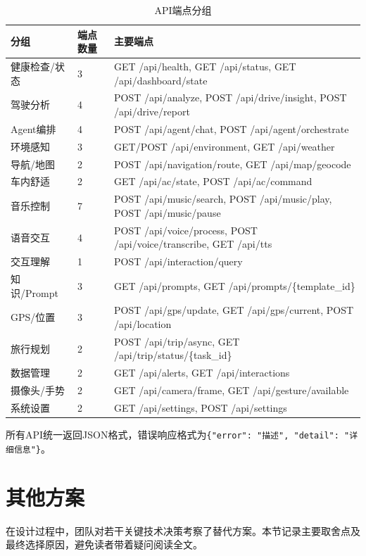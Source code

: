 \documentclass[a4paper]{article}
\begin{document}
\begin{table}[H]
  \centering
  \caption{API端点分组}
  \label{tab:api}
  \begin{tabular}{lll}
  \toprule
  分组 & 端点数量 & 主要端点 \\
  \midrule
  健康检查/状态 & 3 & GET /api/health, GET /api/status, GET /api/dashboard/state \\
  驾驶分析 & 4 & POST /api/analyze, POST /api/drive/insight, POST /api/drive/report \\
  Agent编排 & 4 & POST /api/agent/chat, POST /api/agent/orchestrate \\
  环境感知 & 3 & GET/POST /api/environment, GET /api/weather \\
  导航/地图 & 2 & POST /api/navigation/route, GET /api/map/geocode \\
  车内舒适 & 2 & GET /api/ac/state, POST /api/ac/command \\
  音乐控制 & 7 & POST /api/music/search, POST /api/music/play, POST /api/music/pause \\
  语音交互 & 4 & POST /api/voice/process, POST /api/voice/transcribe, GET /api/tts \\
  交互理解 & 1 & POST /api/interaction/query \\
  知识/Prompt & 3 & GET /api/prompts, GET /api/prompts/\{template\_id\} \\
  GPS/位置 & 3 & POST /api/gps/update, GET /api/gps/current, POST /api/location \\
  旅行规划 & 2 & POST /api/trip/async, GET /api/trip/status/\{task\_id\} \\
  数据管理 & 2 & GET /api/alerts, GET /api/interactions \\
  摄像头/手势 & 2 & GET /api/camera/frame, GET /api/gesture/available \\
  系统设置 & 2 & GET /api/settings, POST /api/settings \\
  \bottomrule
  \end{tabular}
\end{table}

所有API统一返回JSON格式，错误响应格式为\texttt{\{"error": "描述", "detail": "详细信息"\}}。

\section{其他方案}

在设计过程中，团队对若干关键技术决策考察了替代方案。本节记录主要取舍点及最终选择原因，避免读者带着疑问阅读全文。
\end{document}
